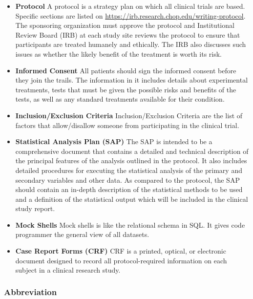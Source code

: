 \documentclass[
]{ctexart}
\begin{document}
\begin{itemize}
\item
  \textbf{Protocol} A protocol is a strategy plan on which all clinical
  trials are based. Specific sections are listed on
  \url{https://irb.research.chop.edu/writing-protocol}. The sponsoring
  organization must approve the protocol and Institutional Review Board
  (IRB) at each study site reviews the protocol to ensure that
  participants are treated humanely and ethically. The IRB also
  discusses such issues as whether the likely benefit of the treatment
  is worth its risk.
\item
  \textbf{Informed Consent} All patients should sign the informed
  consent before they join the trails. The information in it includes
  details about experimental treatments, tests that must be given the
  possible risks and benefits of the tests, as well as any standard
  treatments available for their condition.
\item
  \textbf{Inclusion/Exclusion Criteria} Inclusion/Exclusion Criteria are
  the list of factors that allow/disallow someone from participating in
  the clinical trial.
\item
  \textbf{Statistical Analysis Plan (SAP)} The SAP is intended to be a
  comprehensive document that contains a detailed and technical
  description of the principal features of the analysis outlined in the
  protocol. It also includes detailed procedures for executing the
  statistical analysis of the primary and secondary variables and other
  data. As compared to the protocol, the SAP should contain an in-depth
  description of the statistical methods to be used and a definition of
  the statistical output which will be included in the clinical study
  report.
\item
  \textbf{Mock Shells} Mock shells is like the relational schema in SQL.
  It gives code programmer the general view of all datasets.
\item
  \textbf{Case Report Forms (CRF)} CRF is a printed, optical, or
  electronic document designed to record all protocol-required
  information on each subject in a clinical research study.
\end{itemize}

\hypertarget{abbreviation}{%
\subsubsection{\texorpdfstring{\textbf{Abbreviation}}{Abbreviation}}\label{abbreviation}}
\end{document}
